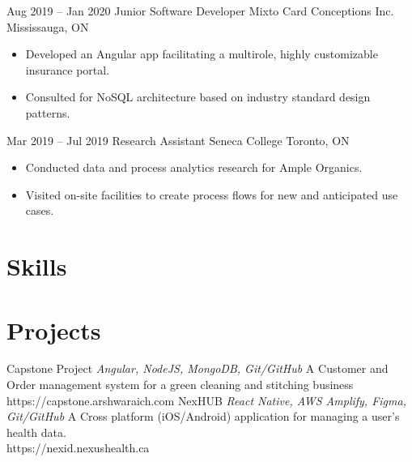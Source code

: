 \documentclass[letterpaper]{moderncv}
\begin{document}
\cventry
{Aug 2019 -- Jan 2020}
{Junior Software Developer}
{Mixto Card Conceptions Inc.}
{Mississauga, ON}
{}
{\begin{itemize}%
	\item Developed an Angular app facilitating a multirole, highly customizable insurance portal.
	\item Consulted for NoSQL architecture based on industry standard design patterns.
	\end{itemize}}
\cventry
{Mar 2019 -- Jul 2019}
{Research Assistant}
{Seneca College}
{Toronto, ON}
{}
{\begin{itemize}%
	\item Conducted data and process analytics research for Ample Organics.
	\item Visited on-site facilities to create process flows for new and anticipated use cases.
	\end{itemize}}
\section{Skills}
\section{Projects}
\cventry
{}
{Capstone Project}
{}
{\textit{Angular, NodeJS, MongoDB, Git/GitHub}}
{}
{A Customer and Order management system for a green cleaning and stitching business\\https://capstone.arshwaraich.com}
\vspace{1mm}
\cventry
{}
{NexHUB}
{}
{\textit{React Native, AWS Amplify, Figma, Git/GitHub}}
{}
{A Cross platform (iOS/Android) application for managing a user's health data.\\https://nexid.nexushealth.ca}
\vspace{1mm}
\end{document}
